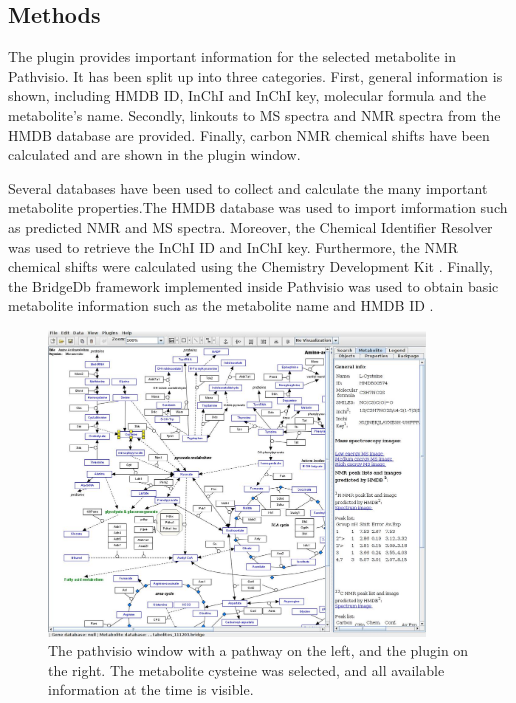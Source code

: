 \documentclass{bioinfo}
\begin{document}
\begin{methods}
\section{Methods}


The plugin provides important information for the selected metabolite in Pathvisio. It has been split up into three categories. First, general information is shown, including HMDB ID, InChI and InChI key, molecular formula and the metabolite's name. Secondly, linkouts to MS spectra and NMR spectra from the HMDB database are provided. Finally, carbon NMR chemical shifts have been calculated and are shown in the plugin window.

Several databases have been used to collect and calculate the many important metabolite properties.The HMDB database \cite{hmdb} was used to import imformation such as predicted NMR and MS spectra. Moreover, the Chemical Identifier Resolver was used to retrieve the InChI ID and InChI key. Furthermore, the NMR chemical shifts were calculated using the Chemistry Development Kit  \cite{cdk}. Finally, the BridgeDb framework implemented inside Pathvisio was used to obtain basic metabolite information such as the metabolite name and HMDB ID \cite{bridge}.

\end{methods}

\begin{figure}[!tpb]%
\centerline{\includegraphics[width=10cm]{figure1.png}}
\caption{The pathvisio window with a pathway on the left, and the plugin on the right. The metabolite cysteine was selected, and all available information at the time is visible.}\label{fig:01}
\end{figure}
\end{document}
